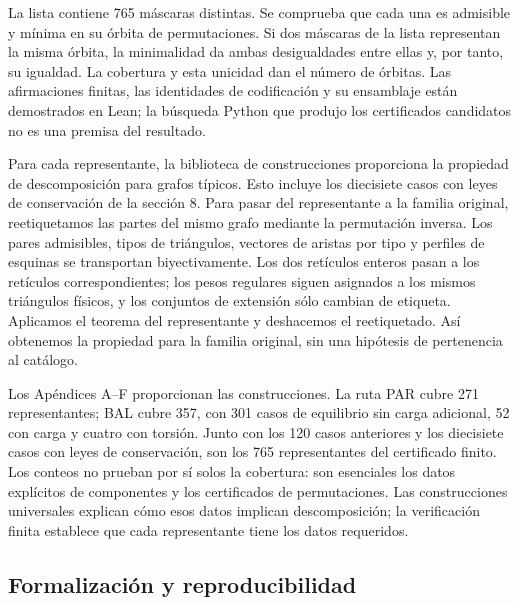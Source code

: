 \documentclass[spanish,11pt,a4paper]{article}
\begin{document}
La lista contiene 765 máscaras distintas. Se comprueba que cada una es admisible y mínima en su órbita de permutaciones. Si dos máscaras de la lista representan la misma órbita, la minimalidad da ambas desigualdades entre ellas y, por tanto, su igualdad. La cobertura y esta unicidad dan el número de órbitas. Las afirmaciones finitas, las identidades de codificación y su ensamblaje están demostrados en Lean; la búsqueda Python que produjo los certificados candidatos no es una premisa del resultado.

Para cada representante, la biblioteca de construcciones proporciona la propiedad de descomposición para grafos típicos. Esto incluye los diecisiete casos con leyes de conservación de la sección 8. Para pasar del representante a la familia original, reetiquetamos las partes del mismo grafo mediante la permutación inversa. Los pares admisibles, tipos de triángulos, vectores de aristas por tipo y perfiles de esquinas se transportan biyectivamente. Los dos retículos enteros pasan a los retículos correspondientes; los pesos regulares siguen asignados a los mismos triángulos físicos, y los conjuntos de extensión sólo cambian de etiqueta. Aplicamos el teorema del representante y deshacemos el reetiquetado. Así obtenemos la propiedad para la familia original, sin una hipótesis de pertenencia al catálogo.

Los Apéndices A--F proporcionan las construcciones. La ruta PAR cubre 271 representantes; BAL cubre 357, con 301 casos de equilibrio sin carga adicional, 52 con carga y cuatro con torsión. Junto con los 120 casos anteriores y los diecisiete casos con leyes de conservación, son los 765 representantes del certificado finito. Los conteos no prueban por sí solos la cobertura: son esenciales los datos explícitos de componentes y los certificados de permutaciones. Las construcciones universales explican cómo esos datos implican descomposición; la verificación finita establece que cada representante tiene los datos requeridos.

\subsection{Formalización y reproducibilidad}\label{formalizaciuxf3n-y-reproducibilidad}
\end{document}
